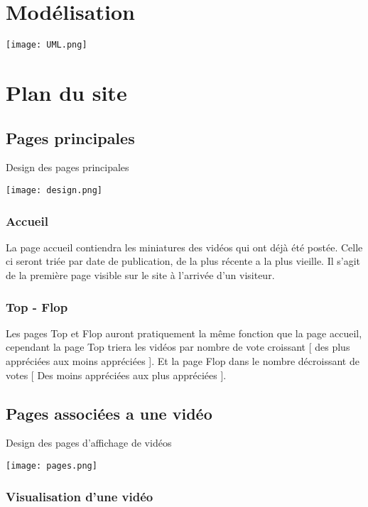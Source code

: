 \documentclass{article}
\begin{document}
\section{Modélisation}

\texttt{[image: UML.png]}

\newpage

\section{Plan du site}

\subsection{Pages principales}
\begin{center}
Design des pages principales
\end{center}
\texttt{[image: design.png]}


\subsubsection{Accueil}
La page accueil contiendra les miniatures des vidéos qui ont déjà été postée. Celle ci seront triée par date de publication, de la plus récente a la plus vieille.
Il s'agit de la première page visible sur le site à l’arrivée d'un visiteur.

\subsubsection{Top - Flop}
Les pages Top et Flop auront pratiquement la même fonction que la page accueil, cependant la page Top triera les vidéos par nombre de vote croissant [ des plus appréciées aux moins appréciées ]. Et la page Flop dans le nombre décroissant de votes [ Des moins appréciées aux plus appréciées ].
\newpage
\subsection{Pages associées a une vidéo}
\begin{center}
Design des pages d'affichage de vidéos
\end{center}
\texttt{[image: pages.png]}

\subsubsection{Visualisation d'une vidéo}
\end{document}
